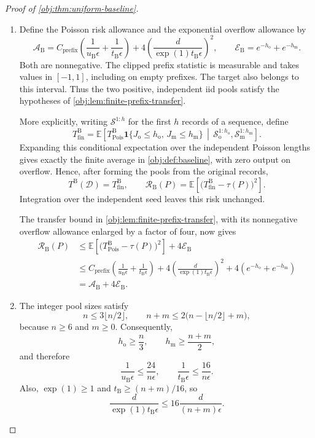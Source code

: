 \documentclass[11pt]{article}
\begin{document}
\begin{proof}[Proof of \cref{obj:thm:uniform-baseline}]
\begin{enumerate}
\item
Define the Poisson risk allowance and the exponential overflow allowance by
\[
\mathcal A_{\mathrm B}
=
C_{\mathrm{prefix}}
\left(
\frac{1}{u_{\mathrm B}\epsilon}
+
\frac{1}{t_{\mathrm B}\epsilon}
\right)
+
4\left(\frac{d}{\exp(1)t_{\mathrm B}\epsilon}\right)^2,
\qquad
\mathcal E_{\mathrm B}
=
e^{-h_{\mathrm o}}+e^{-h_{\mathrm m}}.
\]
Both are nonnegative. The clipped prefix statistic is measurable and takes values in \([-1,1]\), including on empty prefixes. The target also belongs to this interval. Thus the two positive, independent iid pools satisfy the hypotheses of
\cref{obj:lem:finite-prefix-transfer}.

More explicitly, writing \(\mathcal S^{1:h}\) for the first \(h\) records of a sequence, define
\[
T_{\mathrm{fin}}^{\mathrm B}
=
\mathbb E\!\left[
T_{\mathrm{Pois}}^{\mathrm B}
\mathbf1\{J_{\mathrm o}\le h_{\mathrm o},\,
J_{\mathrm m}\le h_{\mathrm m}\}
\,\middle|\,
\mathcal S_{\mathrm o}^{1:h_{\mathrm o}},
\mathcal S_{\mathrm m}^{1:h_{\mathrm m}}
\right].
\]
Expanding this conditional expectation over the independent Poisson lengths gives exactly the finite average in \cref{obj:def:baseline}, with zero output on overflow. Hence, after forming the pools from the original records,
\[
T^{\mathrm B}(\mathcal D)=T_{\mathrm{fin}}^{\mathrm B},
\qquad
\mathcal R_{\mathrm B}(P)
=
\mathbb E\!\left[
\bigl(T_{\mathrm{fin}}^{\mathrm B}-\tau(P)\bigr)^2
\right].
\]
Integration over the independent seed leaves this risk unchanged.

The transfer bound in \cref{obj:lem:finite-prefix-transfer}, with its nonnegative overflow allowance enlarged by a factor of four, now gives
\[
\begin{aligned}
\mathcal R_{\mathrm B}(P)
&\le
\mathbb E\!\left[
\bigl(T_{\mathrm{Pois}}^{\mathrm B}-\tau(P)\bigr)^2
\right]
+
4\mathcal E_{\mathrm B}\\
&\le
C_{\mathrm{prefix}}
\left(
\frac{1}{u_{\mathrm B}\epsilon}
+
\frac{1}{t_{\mathrm B}\epsilon}
\right)
+
4\left(\frac{d}{\exp(1)t_{\mathrm B}\epsilon}\right)^2
+
4\left(e^{-h_{\mathrm o}}+e^{-h_{\mathrm m}}\right)\\
&=
\mathcal A_{\mathrm B}+4\mathcal E_{\mathrm B}.
\end{aligned}
\]

\item
The integer pool sizes satisfy
\[
n\le3\lfloor n/2\rfloor,
\qquad
n+m\le2\bigl(n-\lfloor n/2\rfloor+m\bigr),
\]
because \(n\ge6\) and \(m\ge0\). Consequently,
\[
h_{\mathrm o}\ge\frac n3,
\qquad
h_{\mathrm m}\ge\frac{n+m}{2},
\]
and therefore
\[
\frac{1}{u_{\mathrm B}\epsilon}
\le\frac{24}{n\epsilon},
\qquad
\frac{1}{t_{\mathrm B}\epsilon}
\le\frac{16}{n\epsilon}.
\]
Also, \(\exp(1)\ge1\) and \(t_{\mathrm B}\ge(n+m)/16\), so
\[
\frac{d}{\exp(1)t_{\mathrm B}\epsilon}
\le
16\frac{d}{(n+m)\epsilon}.
\]


\end{enumerate}
\end{proof}
\end{document}
